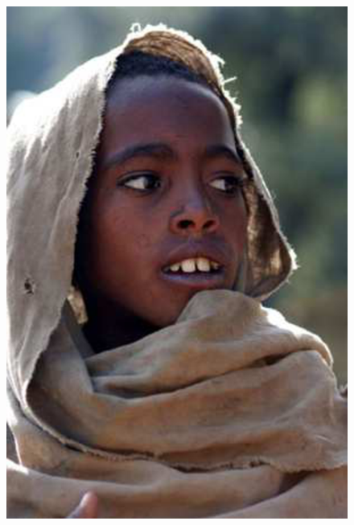 \documentclass[a4paper, 11pt]{article}
\begin{document}
\begin{figure}[h]
\begin{center}
    \scalebox{0.4}
    {   
        \includegraphics{etiopan.eps}
}
\end{center}
\end{figure}
\end{document}
